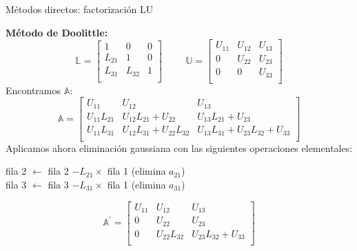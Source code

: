 \documentclass[9pt, aspectratio=169]{beamer}
\begin{document}
\begin{frame}{Métodos directos: factorización LU}

\textbf{Método de Doolittle:}
 \begin{equation*}
\mathbb{L} = \left[ 
 \begin{array}{ccc}
 1 & 0 & 0 \\
 L_{21} & 1 & 0 \\
 L_{31} & L_{32} &1 \\
 \end{array} \right] \hspace{1cm} 
\mathbb{U} = \left[ 
 \begin{array}{ccc}
 U_{11} & U_{12} & U_{13} \\
 0 & U_{22} & U_{23} \\
 0 & 0 & U_{33} \\
 \end{array} \right]
 \end{equation*}
Encontramos $\mathbb{A}$:
\begin{equation*}
 \mathbb{A}= \left[ \begin{array}{lll}
 U_{11} & U_{12} & U_{13} \\
 U_{11} L_{21} & U_{12} L_{21}+U_{22} & U_{13} L_{21} + U_{23} \\
 U_{11} L_{31} & U_{12} L_{31}+U_{22}L_{32} & U_{13} L_{31}+U_{23} L_{32} + U_{33} \\
 \end{array} \right]
\end{equation*} \pause
Aplicamos ahora eliminación gaussiana con las siguientes operaciones elementales:
\begin{center}
 fila 2 $\leftarrow$ fila 2 $- L_{21} \times$ fila 1 (elimina $a_{21}$) \\
 fila 3 $\leftarrow$ fila 3 $- L_{31} \times$ fila 1 (elimina $a_{31}$)
\end{center}
\begin{equation*}
 \mathbb{A}^{\prime}= \left[ \begin{array}{ccc}
 U_{11} & U_{12} & U_{13} \\
 0 & U_{22} & U_{23} \\
 0 & U_{22}L_{32} & U_{23} L_{32} + U_{33} \\
 \end{array} \right]
\end{equation*}
\end{frame}
\end{document}
